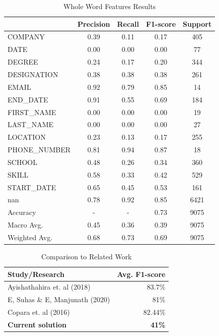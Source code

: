   \clearpage
  \begin{table}[t]
    \centering
    \begin{tabular}{|l|c|c|c|c|}
         \hline
             & Precision & Recall & F1-score & Support \\
         \hline
     COMPANY & 0.39 & 0.11 & 0.17 &  405 \\
        DATE & 0.00 & 0.00 & 0.00 &   77 \\
      DEGREE & 0.24 & 0.17 & 0.20 &  344 \\
 DESIGNATION & 0.38 & 0.38 & 0.38 &  261 \\
       EMAIL & 0.92 & 0.79 & 0.85 &   14 \\
    END\_DATE & 0.91 & 0.55 & 0.69 &  184 \\
  FIRST\_NAME & 0.00 & 0.00 & 0.00 &   19 \\
   LAST\_NAME & 0.00 & 0.00 & 0.00 &   27 \\
    LOCATION & 0.23 & 0.13 & 0.17 &  255 \\
PHONE\_NUMBER & 0.81 & 0.94 & 0.87 &   18 \\
      SCHOOL & 0.48 & 0.26 & 0.34 &  360 \\
       SKILL & 0.58 & 0.33 & 0.42 &  529 \\
  START\_DATE & 0.65 & 0.45 & 0.53 &  161 \\
         nan & 0.78 & 0.92 & 0.85 & 6421 \\
         \hline
    Accuracy &  -  &   -  & 0.73 & 9075 \\
   Macro Avg. & 0.45 & 0.36 & 0.39 & 9075 \\
Weighted Avg. & 0.68 & 0.73 & 0.69 & 9075 \\
         \hline
    \end{tabular}
    \caption{Whole Word Features Results}
    \label{table:6}
  \end{table}

  \begin{table}[t]
    \centering
    \begin{tabular}{|l|r|}
         \hline
         \textbf{Study/Research} & \textbf{Avg. F1-score} \\
         \hline
             Ayishathahira et. al (2018) \cite{Ayishathahira2018a} & 83.7\% \\
             E, Suhas \& E, Manjunath (2020) \cite{E*2020} & 81\% \\
             Copara et. al (2016) \cite{Copara2016} & 82.44\% \\
         \hline
             \textbf{Current solution} & \textbf{41\%} \\
         \hline
    \end{tabular}
    \caption{Comparison to Related Work}
    \label{table:7}
  \end{table}

